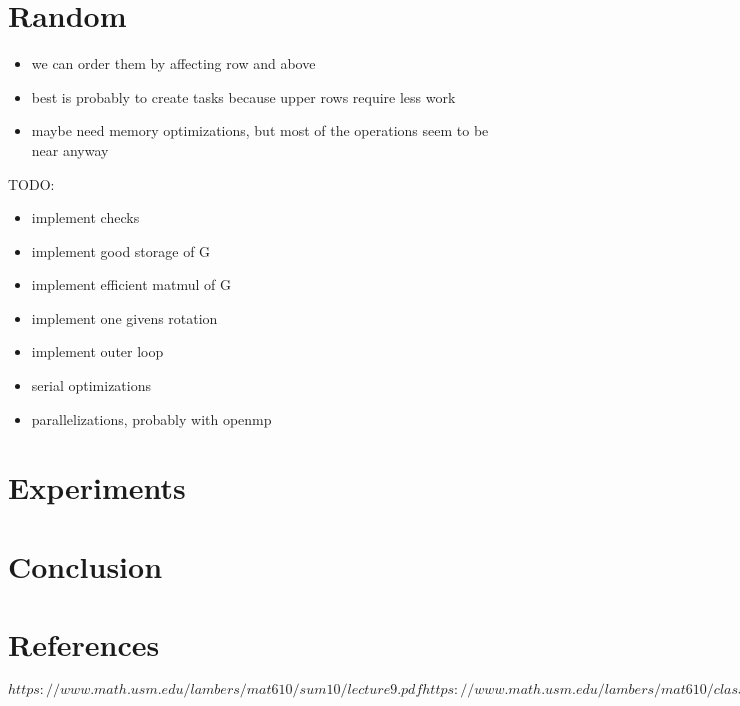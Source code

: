 \documentclass[a4paper]{scrartcl}
\begin{document}
\section{Random} 
    \begin{itemize}
        \item we can order them by affecting row and above
        \item best is probably to create tasks because upper rows require less work
        \item maybe need memory optimizations, but most of the operations seem to be near anyway
    \end{itemize}

    TODO:
    \begin{itemize}
        \item implement checks
        \item implement good storage of G
        \item implement efficient matmul of G
        \item implement one givens rotation
        \item implement outer loop
        \item serial optimizations
        \item parallelizations, probably with openmp
    \end{itemize}





\section{Experiments}
\section{Conclusion}
\section{References}
$https://www.math.usm.edu/lambers/mat610/sum10/lecture9.pdf
https://www.math.usm.edu/lambers/mat610/class0208.pdf
https://en.wikipedia.org/wiki/Givens_rotation$
\end{document}
